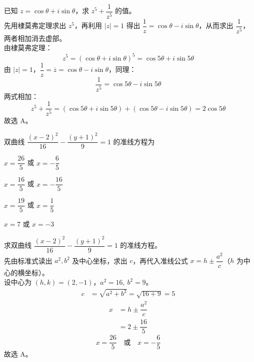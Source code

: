 \documentclass[12pt,a4paper]{exam-zh}
\begin{document}
\begin{solution}
    已知 $z=\cos\theta+i\sin\theta$，求 $z^5+\dfrac{1}{z^5}$ 的值。\\
    先用棣莫弗定理求出 $z^5$，再利用 $|z|=1$ 得出 $\dfrac{1}{z}=\cos\theta-i\sin\theta$，从而求出 $\dfrac{1}{z^5}$，两者相加消去虚部。\\
    由棣莫弗定理：
    \[
        z^5 = (\cos\theta+i\sin\theta)^5 = \cos5\theta+i\sin5\theta
    \]
    由 $|z|=1$，$\dfrac1z=\overline{z}=\cos\theta-i\sin\theta$，同理：
    \[
        \dfrac{1}{z^5} = \cos5\theta-i\sin5\theta
    \]
    两式相加：
    \[
        z^5+\dfrac{1}{z^5} = (\cos5\theta+i\sin5\theta)+(\cos5\theta-i\sin5\theta) = 2\cos5\theta
    \]
    故选 A。
\end{solution}

\begin{question}
    双曲线 $\dfrac{(x-2)^2}{16}-\dfrac{(y+1)^2}{9}=1$ 的准线方程为 \paren[A]
    \begin{choices}
        \item $x=\dfrac{26}{5}$ 或 $x=-\dfrac{6}{5}$
        \item $x=\dfrac{16}{5}$ 或 $x=-\dfrac{16}{5}$
        \item $x=\dfrac{19}{5}$ 或 $x=\dfrac{1}{5}$
        \item $x=7$ 或 $x=-3$
    \end{choices}
\end{question}

\begin{solution}
    求双曲线 $\dfrac{(x-2)^2}{16}-\dfrac{(y+1)^2}{9}=1$ 的准线方程。\\
    先由标准式读出 $a^2,b^2$ 及中心坐标，求出 $c$，再代入准线公式 $x=h\pm\dfrac{a^2}{c}$（$h$ 为中心的横坐标）。\\
    设中心为 $(h,k)=(2,-1)$，$a^2=16,\ b^2=9$。
    \begin{align*}
        c &= \sqrt{a^2+b^2} = \sqrt{16+9} = 5
    \end{align*}
    \begin{align*}
        x &= h\pm\dfrac{a^2}{c} \\
        &= 2\pm\dfrac{16}{5}
    \end{align*}
    \[
        x=\dfrac{26}{5} \quad \text{或} \quad x=-\dfrac{6}{5}
    \]
    故选 A。
\end{solution}
\end{document}
